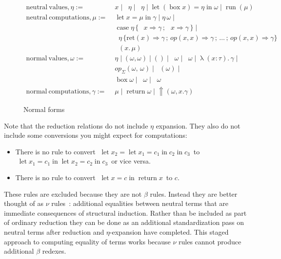 \documentclass[acmsmall, screen, review, anonymous]{acmart}
\theoremstyle{definition}
\newcommand{\reflectname}{\Uparrow}
\newcommand{\performraw}[2]{\mathop{\reflectname(#1(#2))}}
\newcommand{\perform}[5]{\performraw{#1}{#2}(#3, #4. #5)}
\newcommand{\reifyname}{\Downarrow}
\newcommand{\reifyraw}[1]{\mathop{\reifyname_{#1}}}
\newcommand{\reify}[3]{\reifyraw{#1}(#2.\,#3)}
\newcommand{\outlname}{\mathrm{out}_L}
\newcommand{\outl}[1]{\mathop{\outlname} #1}
\newcommand{\outrname}{\mathrm{out}_R}
\newcommand{\outr}[1]{\mathop{\outrname} #1}
\newcommand{\indintro}[4]{#2_{#1}(#3,\, #4)}
\newcommand{\retname}{\mathrm{ret}}
\newcommand{\ret}[2]{\mathop{\retname_{#1}}(#2)}
\newcommand{\indelim}[3]{\mathop{\mathrm{rec}_{#1}} #2 \,\{#3\}}
\newcommand{\indretcase}[2]{\retname(#1) \Rightarrow #2}
\newcommand{\indcase}[4]{#1(#2, #3) \Rightarrow #4}
\newcommand{\seq}{\,;\,}
\newcommand{\fst}{\mathop{\pi_1}}
\newcommand{\snd}{\mathop{\pi_2}}
\newcommand{\inl}[1]{\mathop{\mathrm{in}_L} #1}
\newcommand{\inr}[1]{\mathop{\mathrm{in}_R} #1}
\newcommand{\case}[5]{\mathop{\mathrm{case}} #1 \,\{\,\inl{#2} \Rightarrow #3 \seq \inr{#4} \Rightarrow #5 \,\}}
\newcommand{\abs}[3]{\mathop{\lambda}(#1 \types #2).\,#3}
\newcommand{\app}[2]{#1\,#2}
\newcommand{\types}{\mathrel{:}}
\newcommand{\return}[1]{\mathop{\mathrm{return}} #1}
\newcommand{\letv}[3]{\mathop{\mathrm{let}} #1 = #2 \mathop{\mathrm{in}} #3}
\newcommand{\gbox}[1]{\mathop{\mathrm{box}} #1}
\newcommand{\gunbox}[3]{\mathop{\mathrm{let}} (\gbox #1) = #2 \mathop{\mathrm{in}} #3}
\newcommand{\grun}[1]{\mathop{\mathrm{run}}(#1)}
\begin{document}
\begin{figure}
\begin{align*}
  \mathrm{neutral\ values}, \eta :=\;& x \mid \fst \eta \mid \snd \eta
                                     \mid \gunbox{x}{\eta}{\omega} \mid \grun{\mu} \\
  \mathrm{neutral\ computations}, \mu :=\;& \letv{x}{\mu}{\gamma}
                                           \mid \app{\eta}{\omega} \mid \\
                                   & \case{\eta}{x}{\gamma}{x}{\gamma} \mid \\
                            & \indelim{\Sigma}{\eta}
                              {\indretcase{x}{\gamma} \seq
                               \indcase{op}{x}{x}{\gamma} \seq \ldots \seq
                               \indcase{op}{x}{x}{\gamma}} \\
                                   & \reify{\Sigma}{x}{\mu} \\
  \mathrm{normal\ values}, \omega :=\;& \eta \mid (\omega, \omega)
                           \mid () \mid \inl{\omega} \mid \inr{\omega} \mid \abs{x}{\tau}{\gamma} \mid \\
                           &\indintro{\Sigma}{op}{\omega}{\omega} \mid \ret{\Sigma}{\omega} \mid \\
                           &\gbox{\omega} \mid \outl{\omega} \mid \outr{\omega} \\
  \mathrm{normal\ computations}, \gamma :=\;& \mu \mid \return{\omega}
                                               \mid \perform{\eta}{op}{\omega}{x}{\gamma}
\end{align*}
\caption{Normal forms}
\label{fig:normal}
\end{figure}

Note that the reduction relations do not include $\eta$ expansion. They
also do not include some conversions you might expect for computations:
\begin{itemize}
\item There is no rule to convert
  $\; \letv{x_2}{\letv{x_1}{c_1}{c_2}}{c_3} \,$ to
  $\; \letv{x_1}{c_1}{\letv{x_2}{c_2}{c_3}} \,$ or vice versa.
\item There is no rule to convert $\; \letv{x}{c}{\return x} \,$ to $c$.
\end{itemize}
These rules are excluded because they are not $\beta$ rules. Instead
they are better thought of as $\nu$ rules~\cite{allais2013new}:
additional equalities between neutral terms that are immediate
consequences of structural induction. Rather than be included as part of
ordinary reduction they can be done as an additional standardization
pass on neutral terms after reduction and $\eta$-expansion have
completed. This staged approach to computing equality of terms works
because $\nu$ rules cannot produce additional $\beta$ redexes.
\end{document}
